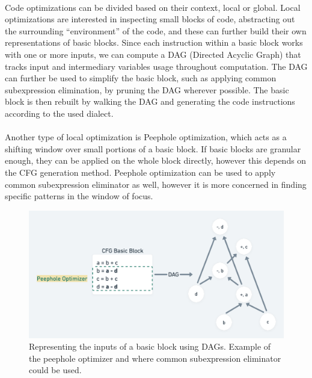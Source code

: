 \paragraph*{}
Code optimizations can be divided based on their context, local or global. Local optimizations are interested in inspecting small blocks of code, abstracting out the surrounding ``environment'' of the code, and these can further build their own representations of basic blocks. Since each instruction within a basic block works with one or more inputs, we can compute a DAG (Directed Acyclic Graph) that tracks input and intermediary variables usage throughout computation. The DAG can further be used to simplify the basic block, such as applying common subexpression elimination, by pruning the DAG wherever possible. The basic block is then rebuilt by walking the DAG and generating the code instructions according to the used dialect.

\paragraph*{}
Another type of local optimization is Peephole optimization, which acts as a shifting window over small portions of a basic block. If basic blocks are granular enough, they can be applied on the whole block directly, however this depends on the CFG generation method. Peephole optimization can be used to apply common subexpression eliminator as well, however it is more concerned in finding specific patterns in the window of focus.

\begin{figure}
    \centering
    \includegraphics[width=15cm]{images/dag_peephole.png}
    \caption{Representing the inputs of a basic block using DAGs. Example of the peephole optimizer and where common subexpression eliminator could be used.}
    \label{fig:dag-peephole-example}
\end{figure}

